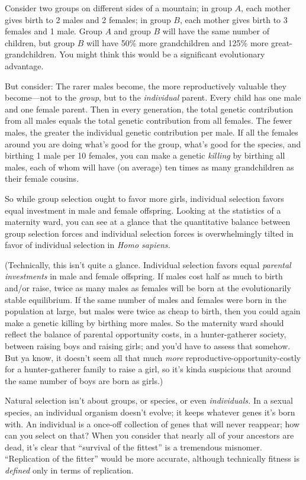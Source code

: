 {
 Consider two groups on different sides of a mountain; in group $A$,
each mother gives birth to 2 males and 2 females; in group $B$, each
mother gives birth to 3 females and 1 male. Group $A$ and group $B$ will
have the same number of children, but group $B$ will have 50\% more
grandchildren and 125\% more great-grandchildren. You might think this
would be a significant evolutionary advantage.}

{
 But consider: The rarer males become, the more reproductively
valuable they become---not to the \textit{group}, but to the
\textit{individual} parent. Every child has one male and one female
parent. Then in every generation, the total genetic contribution from
all males equals the total genetic contribution from all females. The
fewer males, the greater the individual genetic contribution per male.
If all the females around you are doing what's good for
the group, what's good for the species, and birthing 1
male per 10 females, you can make a genetic \textit{killing} by
birthing all males, each of whom will have (on average) ten times as
many grandchildren as their female cousins.}

{
 So while group selection ought to favor more girls, individual
selection favors equal investment in male and female offspring. Looking
at the statistics of a maternity ward, you can see at a glance that the
quantitative balance between group selection forces and individual
selection forces is overwhelmingly tilted in favor of individual
selection in \textit{Homo sapiens.}}

{
 (Technically, this isn't quite a glance.
Individual selection favors equal \textit{parental investments} in male
and female offspring. If males cost half as much to birth and/or raise,
twice as many males as females will be born at the evolutionarily
stable equilibrium. If the same number of males and females were born
in the population at large, but males were twice as cheap to birth,
then you could again make a genetic killing by birthing more males. So
the maternity ward should reflect the balance of parental opportunity
costs, in a hunter-gatherer society, between raising boys and raising
girls; and you'd have to assess that somehow. But ya
know, it doesn't seem all that much \textit{more}
reproductive-opportunity-costly for a hunter-gatherer family to raise a
girl, so it's kinda suspicious that around the same
number of boys are born as girls.)}

{
 Natural selection isn't about groups, or species,
or even \textit{individuals.} In a sexual species, an individual
organism doesn't evolve; it keeps whatever genes
it's born with. An individual is a once-off collection
of genes that will never reappear; how can you select on that? When you
consider that nearly all of your ancestors are dead,
it's clear that ``survival of the
fittest'' is a tremendous misnomer.
``Replication of the fitter'' would
be more accurate, although technically fitness is \textit{defined} only
in terms of replication.}

